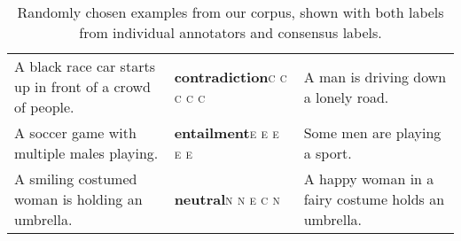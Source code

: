 \documentclass[12pt]{article} %
\newcommand{\fulllabel}[2]{\textbf{#1}\newline\textsc{#2}}
\begin{document}
\begin{table}[bh!]
  \centering\small
  \begin{tabular}{p{6.0cm}p{2.3cm}p{6.0cm}}
  \toprule
\rule{0pt}{3ex}A black race car starts up in front of a crowd of people. & \fulllabel{contradiction}{c c c c c} & A man is driving down a lonely road.\\
\rule{0pt}{3ex}A soccer game with multiple males playing. & \fulllabel{entailment}{e e e e e} & Some men are playing a sport.\\
\rule{0pt}{3ex}A smiling costumed woman is holding an umbrella. & \fulllabel{neutral}{n n e c n} & A happy woman in a fairy costume holds an umbrella.\\
    \bottomrule
  \end{tabular}
\caption{Randomly chosen examples from our corpus, shown with both labels from individual annotators and consensus labels.\label{examples}}
\end{table}


 
\end{document}
